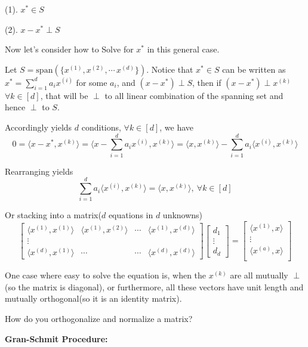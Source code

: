 (1). $x^{*} \in S$

(2). $x-x^{*}\perp S$

\vspace{0.3cm}
Now let's consider how to Solve for $x^{*}$ in this general case.

Let $S=\text{span}\left(\{x^{(1)},x^{(2)},\cdots\,x^{(d)}\}\right)$. Notice that $x^{*}\in S$ can be written as $x^{*}=\sum_{i=1}^{d}a_{i}x^{(i)}$ for some $a_{i}$, and $(x-x^{*}) \perp S$, then if $(x-x^{*}) \perp x^{(k)}$ $\forall k\in [d]$, that will be $\perp$ to all linear combination of the spanning set and hence $\perp$ to $S$.

Accordingly yields $d$ conditions, $\forall k\in [d]$, we have
$$0=\langle x-x^{*},x^{(k)}\rangle=\langle x-\sum_{i=1}^{d}a_{i}x^{(i)},x^{(k)}\rangle=\langle x,x^{(k)}\rangle-\sum_{i=1}^{d}a_{i}\langle x^{(i)},x^{(k)}\rangle$$

Rearranging yields
$$\sum_{i=1}^{d}a_{i}\langle x^{(i)},x^{(k)}\rangle=\langle x,x^{(k)}\rangle ,\ \forall k\in [d]$$

Or stacking into a matrix($d$ equations in $d$ unknowns)
$$\left[ 
\begin{array}{cccc} 
\langle x^{(1)},x^{(1)}\rangle & \langle x^{(1)},x^{(2)}\rangle &\cdots& \langle x^{(1)},x^{(d)}\rangle\\
\vdots&&& \\
\langle x^{(d)},x^{(1)}\rangle & \cdots &\cdots& \langle x^{(d)},x^{(d)}\rangle
\end{array}
\right]
\left[ 
\begin{array}{c} 
d_{1}\\
\vdots\\
d_{d}
\end{array}
\right]=
\left[ 
\begin{array}{c} 
\langle x^{(1)},x\rangle\\
\vdots\\
\langle x^{(a)},x\rangle\\
\end{array}
\right]$$

One case where easy to solve the equation is, when the $x^{(k)}$ are all mutually $\perp$ (so the matrix is diagonal), or furthermore, all these vectors have unit length and mutually orthogonal(so it is an identity matrix).

\vspace{0.3cm}
How do you orthogonalize and normalize a matrix?

\textbf{Gran-Schmit Procedure:}

